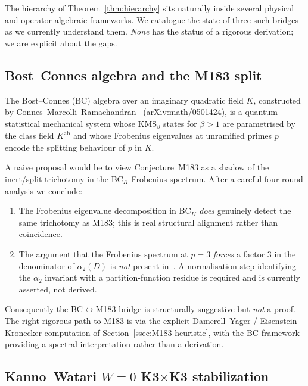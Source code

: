 \documentclass[12pt]{amsart}
\theoremstyle{definition}
\begin{document}
The hierarchy of Theorem~\ref{thm:hierarchy} sits naturally inside
several physical and operator-algebraic frameworks. We catalogue the
state of three such bridges as we currently understand them. \emph{None}
has the status of a rigorous derivation; we are explicit about the
gaps.

\subsection{Bost--Connes algebra and the M183 split}

The Bost--Connes (BC) algebra over an imaginary quadratic field $K$,
constructed by Connes--Marcolli--Ramachandran~\cite{ConnesMarcolliRamachandran2005}
(arXiv:math/0501424), is a quantum statistical mechanical system
whose KMS$_\beta$ states for $\beta > 1$ are parametrised by the
class field $K^{\mathrm{ab}}$ and whose Frobenius eigenvalues at
unramified primes $p$ encode the splitting behaviour of $p$ in $K$.

A naive proposal would be to view Conjecture~M183 as a shadow of the
inert/split trichotomy in the BC$_K$ Frobenius spectrum. After a
careful four-round analysis we conclude:
\begin{enumerate}[leftmargin=2em]
  \item The Frobenius eigenvalue decomposition in BC$_K$ \emph{does}
        genuinely detect the same trichotomy as M183; this is real
        structural alignment rather than coincidence.
  \item The argument that the Frobenius spectrum at $p = 3$
        \emph{forces} a factor $3$ in the denominator of $\alpha_2(D)$
        is \emph{not} present in~\cite{ConnesMarcolliRamachandran2005}.
        A normalisation step
        identifying the $\alpha_2$ invariant with a partition-function
        residue is required and is currently asserted, not derived.
\end{enumerate}
Consequently the BC$\leftrightarrow$M183 bridge is structurally suggestive but
\emph{not} a proof. The right rigorous path to M183 is via the explicit
Damerell--Yager / Eisenstein--Kronecker computation of
Section~\ref{ssec:M183-heuristic}, with the BC framework providing a
spectral interpretation rather than a derivation.

\subsection{Kanno--Watari $W = 0$ K3$\times$K3 stabilization}
\end{document}

